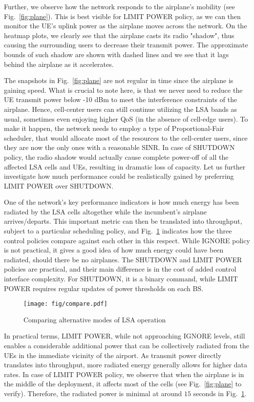 \documentclass[journal]{IEEEtran}
\begin{document}
Further, we observe how the network responds to the airplane's mobility (see Fig.~\ref{fig:plane}). This is best visible for LIMIT POWER policy, as we can then monitor the UE's uplink power as the airplane moves across the network. On the heatmap plots, we clearly see that the airplane casts its radio "shadow", thus causing the surrounding users to decrease their transmit power. The approximate bounds of such shadow are shown with dashed lines and we see that it lags behind the airplane as it accelerates.

The snapshots in Fig.~\ref{fig:plane} are not regular in time since the airplane is gaining speed. What is crucial to note here, is that we never need to reduce the UE transmit power below -10 dBm to meet the interference constraints of the airplane. Hence, cell-center users can still continue utilizing the LSA bands as usual, sometimes even enjoying higher QoS (in the absence of cell-edge users). To make it happen, the network needs to employ a type of Proportional-Fair scheduler, that would allocate most of the resources to the cell-center users, since they are now the only ones with a reasonable SINR. In case of SHUTDOWN policy, the radio shadow would actually cause complete power-off of all the affected LSA cells and UEs, resulting in dramatic loss of capacity. Let us further investigate how much performance could be realistically gained by preferring LIMIT POWER over SHUTDOWN.

One of the network's key performance indicators is how much energy has been radiated by the LSA cells altogether while the incumbent's airplane arrives/departs. This important metric can then be translated into throughput, subject to a particular scheduling policy, and Fig.~\ref{fig:compare} indicates how the three control policies compare against each other in this respect. While IGNORE policy is not practical, it gives a good idea of how much energy could have been radiated, should there be no airplanes. The SHUTDOWN and LIMIT POWER policies are practical, and their main difference is in the cost of added control interface complexity. For SHUTDOWN, it is a binary command, while LIMIT POWER requires regular updates of power thresholds on each BS.

\begin{figure}[!ht]
\centering
\texttt{[image: fig/compare.pdf]}
\caption{Comparing alternative modes of LSA operation}
\label{fig:compare}
\end{figure}

In practical terms, LIMIT POWER, while not approaching IGNORE levels, still enables a considerable additional power that can be collectively radiated from the UEs in the immediate vicinity of the airport. As transmit power directly translates into throughput, more radiated energy generally allows for higher data rates. In case of LIMIT POWER policy, we observe that when the airplane is in the middle of the deployment, it affects most of the cells (see Fig.~\ref{fig:plane} to verify). Therefore, the radiated power is minimal at around $15$ seconds in Fig.~\ref{fig:compare}. 
\end{document}
